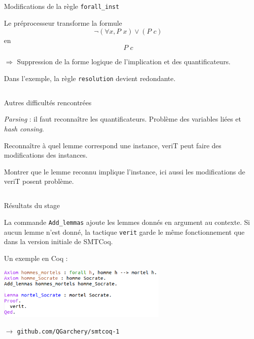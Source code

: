 \documentclass{beamer}
\begin{document}
\subsection{}
\begin{frame}{Modifications de la règle \texttt{forall\_inst}}

Le préprocesseur transforme la formule 
\[  \neg (\forall x, P \,\, x) \vee (P \, \, c)  \] 
en 
\[  P \, \, c \]

\vspace{5mm}

$\Longrightarrow$ Suppression de la forme logique de l'implication et des quantificateurs.
    
\vspace{5mm}    
    
Dans l'exemple, la règle \texttt{resolution} devient redondante.    
    
\end{frame}


\subsection{}
\begin{frame}{Autres difficultés rencontrées}

\textit{Parsing} : il faut reconnaître les quantificateurs. Problème des variables liées et \textit{hash consing}. 

\vspace{5mm}    
    
Reconnaître à quel lemme correspond une instance, veriT peut faire des modifications des instances.

\vspace{5mm}    

Montrer que le lemme reconnu implique l'instance, ici aussi les modifications de veriT posent problème.


\end{frame}


\subsection{}
\begin{frame}{Résultats du stage}

La commande \texttt{Add\_lemmas} ajoute les lemmes donnés en argument au contexte. Si aucun lemme n'est donné, la tactique \texttt{verit} garde le même fonctionnement que dans la version initiale de SMTCoq.

\vspace{3mm}
Un exemple en Coq :

\begin{center}
\includegraphics[height=2.5cm]{socrate.png}
\end{center}
\vspace{3mm}

$\longrightarrow $ \texttt{github.com/QGarchery/smtcoq-1}


\end{frame}
\end{document}
